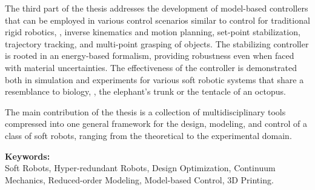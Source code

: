 The third part of the thesis addresses the development of model-based controllers that can be employed in various control scenarios similar to control for traditional rigid robotics, \eg, inverse kinematics and motion planning, set-point stabilization, trajectory tracking, and multi-point grasping of objects. The stabilizing controller is rooted in an energy-based formalism, providing robustness even when faced with material uncertainties. The effectiveness of the controller is demonstrated both in simulation and experiments for various soft robotic systems that share a resemblance to biology, \eg, the elephant's trunk or the tentacle of an octopus.

The main contribution of the thesis is a collection of multidisciplinary tools compressed into one general framework for the design, modeling, and control of a class of soft robots, ranging from the theoretical to the experimental domain.

\vspace*{5pt}\noindent
\textbf{Keywords:} \\ Soft Robots, Hyper-redundant Robots, Design Optimization, Continuum Mechanics, Reduced-order Modeling, Model-based Control, 3D Printing.
